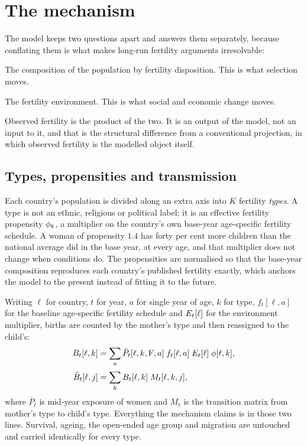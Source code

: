 \section{The mechanism}
\label{sec:mechanism}

The model keeps two questions apart and answers them separately, because
conflating them is what makes long-run fertility arguments irresolvable:

\begin{description}[leftmargin=1.4em,style=nextline]
  \item[Who is becoming more common?] The composition of the population by
  fertility disposition. This is what selection moves.
  \item[How many children does a person of a given disposition have?] The
  fertility environment. This is what social and economic change moves.
\end{description}

Observed fertility is the product of the two. It is an output of the model, not
an input to it, and that is the structural difference from a conventional
projection, in which observed fertility is the modelled object itself.

\subsection{Types, propensities and transmission}

Each country's population is divided along an extra axis into $K$ fertility
\emph{types}. A type is not an ethnic, religious or political label; it is an
effective fertility propensity $\phi_k$, a multiplier on the country's own
base-year age-specific fertility schedule. A woman of propensity $1.4$ has forty
per cent more children than the national average did in the base year, at every
age, and that multiplier does not change when conditions do. The propensities are
normalised so that the base-year composition reproduces each country's published
fertility exactly, which anchors the model to the present instead of fitting it
to the future.

Writing $\ell$ for country, $t$ for year, $a$ for single year of age, $k$ for
type, $f_t[\ell,a]$ for the baseline age-specific fertility schedule and
$E_t[\ell]$ for the environment multiplier, births are counted by the
mother's type and then reassigned to the child's:
\begin{align}
  B_t[\ell,k] &= \sum_a \bar{P}_t[\ell,k,\mathrm{F},a]\;
                 f_t[\ell,a]\;E_t[\ell]\;\phi[\ell,k],
                 \label{eq:births-by-mother}\\[0.2em]
  \tilde{B}_t[\ell,j] &= \sum_k B_t[\ell,k]\; M_t[\ell,k,j],
                 \label{eq:births-by-child}
\end{align}
where $\bar{P}_t$ is mid-year exposure of women and $M_t$ is the transition
matrix from mother's type to child's type. Everything the mechanism claims is in
those two lines. Survival, ageing, the open-ended age group and migration are
untouched and carried identically for every type.

